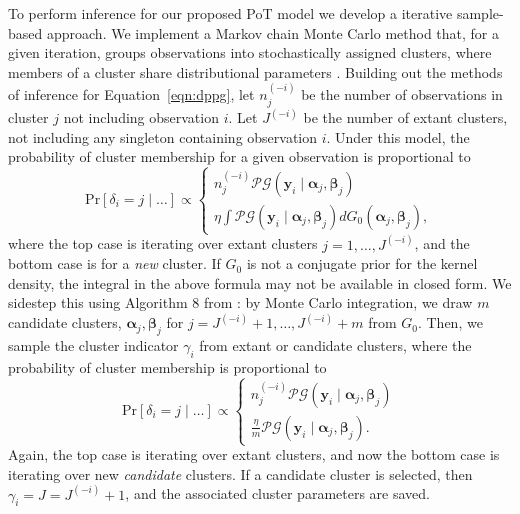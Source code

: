 To perform inference for our proposed PoT model we develop a iterative 
    sample-based approach.  We implement a Markov chain Monte Carlo method that, for a given iteration,  
    groups observations into stochastically assigned clusters, where members of a cluster share 
    distributional parameters \citep{muller2015,ascolani2022}. Building out the methods of inference for 
    Equation~\eqref{eqn:dppg}, 
    let $n_j^{(-i)}$ be the number of observations in cluster $j$ not including observation $i$.  Let $J^{(-i)}$ be 
    the number of extant clusters, not including any singleton containing observation $i$. Under this model, 
    the probability of cluster membership for a given observation is proportional to
    \[
    \text{Pr}\left[\delta_i = j\mid\ldots\right] \propto \begin{cases}
        n_j^{(-i)}\mathcal{PG}\left(\bm{y}_i\mid\bm{\alpha}_j,\bm{\beta}_j\right)\\ %
        \eta\int\mathcal{PG}\left(\bm{y}_i\mid\bm{\alpha}_j,\bm{\beta}_j\right)dG_0(\bm{\alpha}_j,\bm{\beta}_j),%
        \end{cases}
    \]
    where the top case is iterating over extant clusters $j = 1,\ldots, J^{(-i)}$, and the bottom case is
    for a \emph{new} cluster. If $G_0$ is not a conjugate prior for the kernel density, the integral in the 
    above formula may not be available in closed form. We sidestep this using Algorithm 8 from \cite{neal2000}: 
    by Monte Carlo integration, we draw $m$ candidate clusters, $\bm{\alpha}_j,\bm{\beta}_j$ for
    $j = J^{(-i)} + 1,\ldots, J^{(-i)} + m$ from $G_0$. Then, we sample the cluster indicator 
    $\gamma_i$ from extant or candidate clusters, where the probability of cluster membership is proportional to
\begin{equation}
    \text{Pr}\left[\delta_i = j\mid\ldots\right] \propto \begin{cases}
        n_j^{(-i)}\mathcal{PG}\left(\bm{y}_i\mid\bm{\alpha}_j,\bm{\beta}_j\right)\\ %
        \frac{\eta}{m}\mathcal{PG}\left(\bm{y}_i\mid\bm{\alpha}_j,\bm{\beta}_j\right). %
        \end{cases}
\end{equation}
Again, the top case is iterating over extant clusters, and now the bottom case is iterating 
    over new \emph{candidate} clusters.  If a candidate cluster is selected,
    then $\gamma_i = J = J^{(- i)} + 1$, and the associated cluster parameters are saved.

